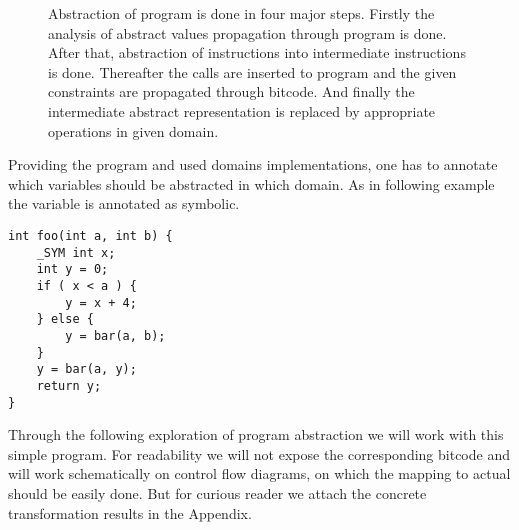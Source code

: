\begin{figure}[!ht]


\caption{Abstraction of program is done in four major steps. Firstly the
analysis of abstract values propagation through program is done. After that,
abstraction of instructions into intermediate \LART instructions is done.
Thereafter the  calls are inserted to program and the given
constraints are propagated through bitcode. And finally the intermediate
abstract representation is replaced by appropriate operations in given domain.}
\label{fig:transformation}
\end{figure}


Providing the program and used domains implementations, one has
to annotate which variables should be abstracted in which domain. As in
following example the variable  is annotated as symbolic.
\begin{verbatim}
int foo(int a, int b) {
    _SYM int x;
    int y = 0;
    if ( x < a ) {
        y = x + 4;
    } else {
        y = bar(a, b);
    }
    y = bar(a, y);
    return y;
}
\end{verbatim}
Through the following exploration of program abstraction we will work with this
simple \Cpp{} program. For readability we will not expose the corresponding \LLVM
bitcode and will work schematically on control flow diagrams, on which the
mapping to actual \LLVM should be easily done. But for curious reader we attach the
concrete \LLVM transformation results in the Appendix.


